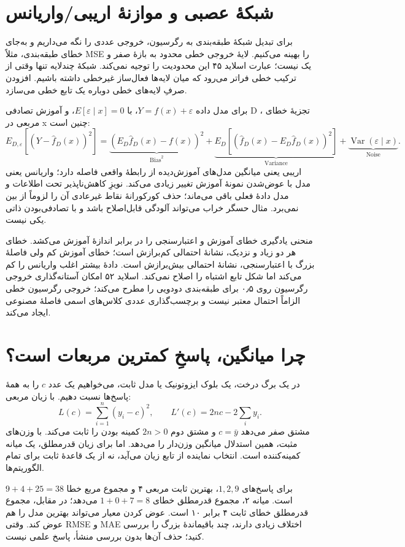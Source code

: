 \section{شبکهٔ عصبی و موازنهٔ اریبی/واریانس}

برای تبدیل شبکهٔ طبقه‌بندی به رگرسیون، خروجی عددی را نگه می‌داریم و به‌جای خطای طبقه‌بندی، مثلاً MSE را بهینه می‌کنیم. لایهٔ خروجی خطی محدود به بازهٔ صفر و یک نیست؛ عبارت اسلاید ۴۵ این محدودیت را توجیه نمی‌کند. شبکهٔ چندلایه تنها وقتی از ترکیب خطی فراتر می‌رود که میان لایه‌ها فعال‌ساز غیرخطی داشته باشیم. افزودن صرفِ لایه‌های خطی دوباره یک تابع خطی می‌سازد.

برای مدل داده \(Y=f(x)+\varepsilon\)، با \(E[\varepsilon\mid x]=0\)، و آموزش تصادفی D ، تجزیهٔ خطای مربعی در x چنین است: \[
E_{D,\varepsilon}[(Y-\widehat f_D(x))^2]
=\underbrace{(E_D\widehat f_D(x)-f(x))^2}_{\mathrm{Bias}^2}
+\underbrace{E_D[(\widehat f_D(x)-E_D\widehat f_D(x))^2]}_{\mathrm{Variance}}
+\underbrace{\operatorname{Var}(\varepsilon\mid x)}_{\mathrm{Noise}}.
\] اریبی یعنی میانگین مدل‌های آموزش‌دیده از رابطهٔ واقعی فاصله دارد؛ واریانس یعنی مدل با عوض‌شدن نمونهٔ آموزش تغییر زیادی می‌کند. نویزِ کاهش‌ناپذیر تحت اطلاعات و مدل دادهٔ فعلی باقی می‌ماند؛ حذف کورکورانهٔ نقاط غیرعادی آن را لزوماً از بین نمی‌برد. مثال حسگر خراب می‌تواند آلودگی قابل‌اصلاح باشد و با تصادفی‌بودن ذاتی یکی نیست.

منحنی یادگیری خطای آموزش و اعتبارسنجی را در برابر اندازهٔ آموزش می‌کشد. خطای هر دو زیاد و نزدیک، نشانهٔ احتمالی کم‌برازش است؛ خطای آموزش کم ولی فاصلهٔ بزرگ با اعتبارسنجی، نشانهٔ احتمالی بیش‌برازش است. دادهٔ بیشتر اغلب واریانس را کم می‌کند اما شکل تابع اشتباه را اصلاح نمی‌کند. اسلاید ۵۲ امکان آستانه‌گذاری خروجی رگرسیون روی ۰٫۵ برای طبقه‌بندی دودویی را مطرح می‌کند؛ خروجی رگرسیون خطی الزاماً احتمال معتبر نیست و برچسب‌گذاری عددی کلاس‌های اسمی فاصلهٔ مصنوعی ایجاد می‌کند.
\section{چرا میانگین، پاسخِ کمترین مربعات است؟}
در یک برگ درخت، یک بلوک ایزوتونیک یا مدل ثابت، می‌خواهیم یک عدد $c$ را به همهٔ پاسخ‌ها نسبت دهیم. با زیان مربعی:
\[L(c)=\sum_{i=1}^n(y_i-c)^2,\qquad L'(c)=2nc-2\sum_i y_i.\]
مشتق صفر می‌دهد $c=\bar y$ و مشتق دوم $2n>0$ کمینه بودن را ثابت می‌کند. با وزن‌های مثبت، همین استدلال میانگین وزن‌دار را می‌دهد. اما برای زیان قدرمطلق، یک میانه کمینه‌کننده است. انتخاب نماینده از تابع زیان می‌آید، نه از یک قاعدهٔ ثابت برای تمام الگوریتم‌ها.

برای پاسخ‌های $1,2,9$، بهترین ثابت مربعی ۴ و مجموع مربع خطا $9+4+25=38$ است. میانه ۲، مجموع قدرمطلق خطای $1+0+7=8$ می‌دهد؛ در مقابل، مجموع قدرمطلق خطای ثابت ۴ برابر ۱۰ است. عوض کردن معیار می‌تواند بهترین مدل را هم عوض کند. وقتی RMSE و MAE اختلاف زیادی دارند، چند باقیماندهٔ بزرگ را بررسی کنید؛ حذف آن‌ها بدون بررسی منشأ، پاسخ علمی نیست.

